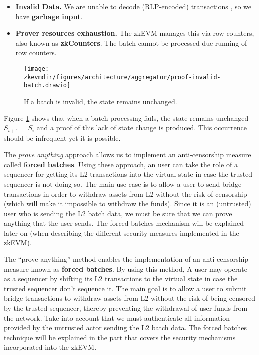\begin{itemize}
\item \textbf{Invalid Data.}
We are unable to decode (RLP-encoded) transactions , so we have \textbf{garbage input}.

\item \textbf{Prover resources exhaustion.}
The zkEVM manages this via row counters, also known as \textbf{zkCounters}. The batch cannot be processed due running of row counters.
\end{itemize}

\begin{figure}[H]
\centering
\texttt{[image: \\zkevmdir/figures/architecture/aggregator/proof-invalid-batch.drawio]}
\caption{If a batch is invalid, the state remains unchanged.}
\label{fig:invalid-batch}
\end{figure}

Figure \ref{fig:invalid-batch} shows that when a batch processing fails, the state remains unchanged $S_{i+1}=S_i$ and a proof of this lack of state change is produced. This occurrence should be infrequent yet it is possible.

The \textit{prove anything} approach allows us to implement an anti-censorship measure called \textbf{forced batches}. Using these approach, an user can take the role of a sequencer for getting its L2 transactions into the virtual state in case the trusted sequencer is not doing so. The main use case is to allow a user to send bridge transactions in order to withdraw assets from L2 without the risk of censorship (which will make it impossible to withdraw the funds). Since it is an (untrusted) user who is sending the L2 batch data, we must be sure that we can prove anything that the user sends. The forced batches mechanism will be explained later on (when describing the different security measures implemented in the zkEVM).

The ``prove anything'' method enables the implementation of an anti-censorship measure known as \textbf{forced batches}. By using this method, A user may operate as a sequencer by shifting its L2 transactions to the virtual state in case the trusted sequencer don't sequence it. The main goal is to allow a user to submit bridge transactions to withdraw assets from L2 without the risk of being censored by the trusted sequencer, thereby preventing the withdrawal of user funds from the network. Take into account that we must authenticate all information provided by the untrusted actor sending the L2 batch data. The forced batches technique will be explained in the part that covers the security mechanisms incorporated into the zkEVM.


